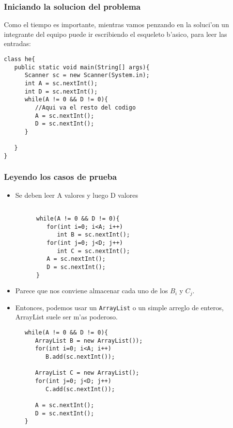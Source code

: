 \documentclass{beamer}
\begin{document}
\begin{frame}[fragile]
 
 \frametitle{Iniciando la solucion del problema}
 Como el tiempo es importante, mientras vamos penzando en la soluci'on un integrante del equipo puede ir escribiendo el esqueleto b'asico, para leer las entradas:
 \begin{lstlisting}
class he{
   public static void main(String[] args){
      Scanner sc = new Scanner(System.in);
      int A = sc.nextInt();
      int D = sc.nextInt();
      while(A != 0 && D != 0){
         //Aqui va el resto del codigo
         A = sc.nextInt();
         D = sc.nextInt();
      }

   }
}
 \end{lstlisting}
\end{frame}
 
\begin{frame}[fragile]
 \frametitle{Leyendo los casos de prueba}

\begin{itemize}
\item Se deben leer A valores y luego D valores
 \begin{lstlisting}
  
      while(A != 0 && D != 0){
         for(int i=0; i<A; i++)
            int B = sc.nextInt();
         for(int j=0; j<D; j++)
            int C = sc.nextInt();
         A = sc.nextInt();
         D = sc.nextInt();
      }

 \end{lstlisting}
\item Parece que nos conviene almacenar cada uno de los $B_i$ y $C_j$.
\item Entonces, podemos usar un \verb|ArrayList| o un simple arreglo de enteros, ArrayList suele ser m'as poderoso.
\end{itemize}
\end{frame}

\begin{frame}[fragile]
 \begin{lstlisting}
      while(A != 0 && D != 0){
         ArrayList B = new ArrayList());
         for(int i=0; i<A; i++)
            B.add(sc.nextInt());

         ArrayList C = new ArrayList();
         for(int j=0; j<D; j++)
            C.add(sc.nextInt());

         A = sc.nextInt();
         D = sc.nextInt();
      }

 \end{lstlisting}

\end{frame}
\end{document}
